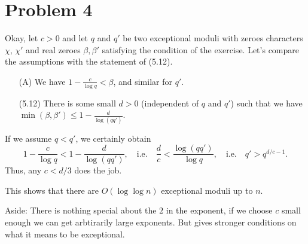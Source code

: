 \documentclass[a4paper,11pt]{article}
\begin{document}
\section*{Problem 4}
Okay, let $c>0$ and let $q$ and $q'$ be two exceptional moduli with zeroes characters
$\chi$, $\chi'$ and real zeroes $\beta, \beta'$ satisfying the condition of the
exercise. Let's compare the assumptions with the statement of (5.12).
\begin{enumerate}
    \item[(A)] We have $1 - \frac c{\log q} < \beta$, and similar for $q'$.
    \item[(5.12)] There is some small $d>0$ (independent of $q$ and $q'$) such
        that we have $\min(\beta, \beta') \leq 1 - \frac d{\log(qq')}$. 
\end{enumerate}
If we assume $q < q'$, we certainly obtain
\[
    1 - \frac c {\log q} < 1 - \frac d {\log(qq')}, \quad \text{i.e.}
    \quad \frac dc < \frac  {\log(qq')}{\log q}, \quad \text{i.e.} \quad
    q' > q^{d/c - 1}.
\]
Thus, any $c < d/3$ does the job. 

This shows that there are $O(\log \log n)$ exceptional moduli up to $n$. 

Aside: There is nothing special about the $2$ in the exponent, if we choose 
$c$ small enough we can get arbtirarily large exponents. But gives stronger conditions on what it means to be exceptional. 


\contactend
\end{document}
